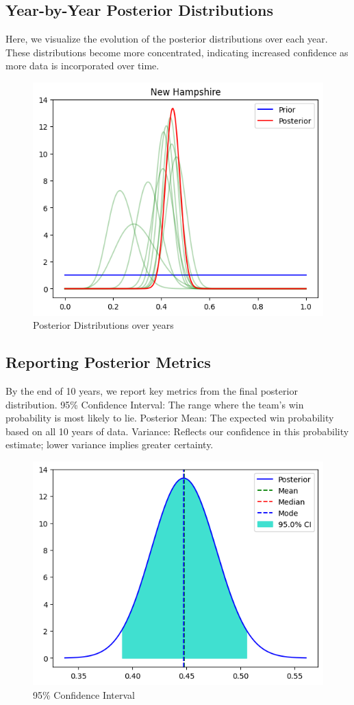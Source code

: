 \subsection{Year-by-Year Posterior Distributions}

Here, we visualize the evolution of the posterior distributions over each year.
These distributions become more concentrated, indicating increased confidence as more data is incorporated over time.

\begin{figure}[!ht]
  \centering
  \includegraphics[width=.6\textwidth]{Project1/Report/images/posterior-years.png}
  \caption{Posterior Distributions over years}
\end{figure}

\subsection{Reporting Posterior Metrics}

By the end of 10 years, we report key metrics from the final posterior distribution.
95\% Confidence Interval: The range where the team’s win probability is most likely to lie.
Posterior Mean: The expected win probability based on all 10 years of data.
Variance: Reflects our confidence in this probability estimate; lower variance implies greater certainty.

\begin{figure}[!ht]
  \centering
  \includegraphics[width=.6\textwidth]{Project1/Report/images/confidence-interval.png}
  \caption{95\% Confidence Interval}
\end{figure}

